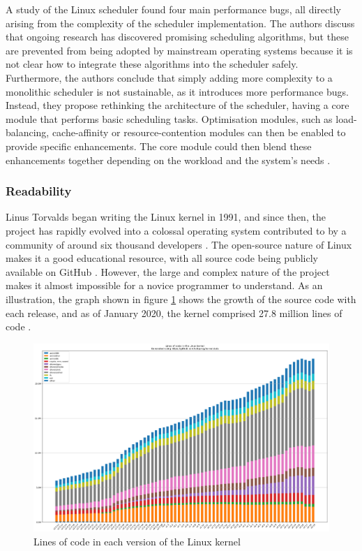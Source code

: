 \documentclass[bsc,frontabs,singlespacing,parskip,deptreport]{infthesis}     %
\begin{document}
A study of the Linux scheduler found four main performance bugs, all directly arising from the complexity of the scheduler implementation. The authors discuss that ongoing research has discovered promising scheduling algorithms, but these are prevented from being adopted by mainstream operating systems because it is not clear how to integrate these algorithms into the scheduler safely. Furthermore, the authors conclude that simply adding more complexity to a monolithic scheduler is not sustainable, as it introduces more performance bugs. Instead, they propose rethinking the architecture of the scheduler, having a core module that performs basic scheduling tasks. Optimisation modules, such as load-balancing, cache-affinity or resource-contention modules can then be enabled to provide specific enhancements. The core module could then blend these enhancements together depending on the workload and the system's needs \cite{wasted-cores}.

\subsubsection{Readability}
Linus Torvalds began writing the Linux kernel in 1991, and since then, the project has rapidly evolved into a colossal operating system contributed to by a community of around six thousand developers \cite{linux-kernel}. The open-source nature of Linux makes it a good educational resource, with all source code being publicly available on GitHub \cite{linux-github}. However, the large and complex nature of the project makes it almost impossible for a novice programmer to understand. As an illustration, the graph shown in figure \ref{linux-growth} shows the growth of the source code with each release, and as of January 2020, the kernel comprised 27.8 million lines of code \cite{linux-loc}.

\begin{figure}[h]
    \centering
    \includegraphics[scale=0.3]{figures/linux-loc.png}
    \caption{Lines of code in each version of the Linux kernel \cite{kernel-stats}}
    \label{linux-growth}
\end{figure}
\end{document}
